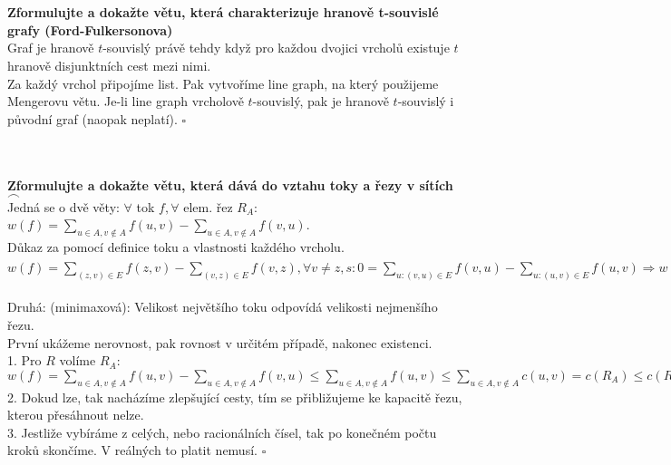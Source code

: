 \documentclass[a4paper]{article}
\newcommand{\fr}{$\frown$}
\newcommand{\led}{\hspace{0.2cm}$\square$}
\newcommand{\hlava}[1]{\text{} \\ \text{} \\ \text{} \hspace{-0.27cm} \textbf{#1} \\}
\begin{document}
\hlava{Zformulujte a dokažte větu, která charakterizuje hranově t-souvislé grafy (Ford-Fulkersonova)}
Graf je hranově $t$-souvislý právě tehdy když pro každou dvojici vrcholů existuje $t$ hranově disjunktních cest mezi nimi. \\
Za každý vrchol připojíme list. Pak vytvoříme line graph, na který použijeme Mengerovu větu. Je-li line graph vrcholově $t$-souvislý, pak je hranově $t$-souvislý i původní graf (naopak neplatí). \led

\hlava{Zformulujte a dokažte větu, která dává do vztahu toky a řezy v sítích \fr}
Jedná se o dvě věty: $\forall $ tok $f, \forall $ elem. řez $R_A$: $w(f) = \sum_{u \in A, v \notin A} f(u,v) - \sum_{u \in A, v \notin A} f(v,u)$. \\
Důkaz za pomocí definice toku a vlastnosti každého vrcholu. $w(f) = \sum_{(z,v)\in E} f(z,v) - \sum_{(v,z)\in E} f(v,z),  \forall v \ne z, s: 0 = \sum_{u: (v,u)\in E} f(v,u) - \sum_{u: (u,v)\in E} f(u,v) \Rightarrow w(f) = \sum_{u \in A} (\sum_{u: (v,u)\in E} f(v,u) - \sum_{u: (u,v)\in E} f(u,v)) = \sum_{u,v \in A, (u,v)\in E ( f(u,v) - f(v,u)} + \sum_{u \in A, v \notin A} f(u,v) - \sum_{u \in A, v \notin A} f(v,u) = \sum_{u \in A, v \notin A} f(u,v) - \sum_{u \in A, v \notin A} f(v,u)$ \\ \\
Druhá: (minimaxová): Velikost největšího toku odpovídá velikosti nejmenšího řezu. \\
První ukážeme nerovnost, pak rovnost v určitém případě, nakonec existenci.\\
1. Pro $R$ volíme $R_A$: $w(f) = \sum_{u \in A, v \notin A} f(u,v) - \sum_{u \in A, v \notin A} f(v,u) \le \sum_{u \in A, v \notin A} f(u,v) \le \sum_{u \in A, v \notin A} c(u,v) = c(R_A) \le c(R)$ \\
2. Dokud lze, tak nacházíme zlepšující cesty, tím se přibližujeme ke kapacitě řezu, kterou přesáhnout nelze. \\
3. Jestliže vybíráme z celých, nebo racionálních čísel, tak po konečném počtu kroků skončíme. V reálných to platit nemusí. \led
\end{document}
